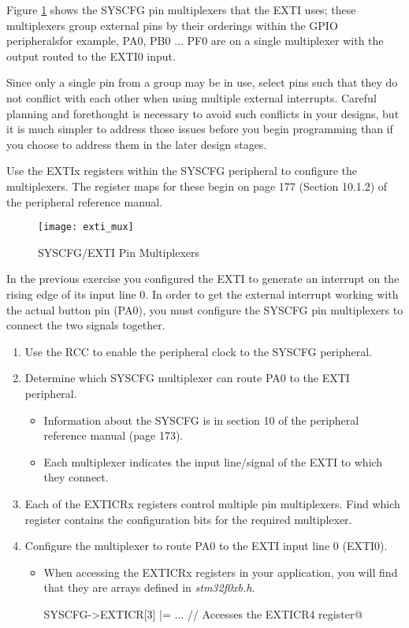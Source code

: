 \documentclass[openany,11pt,fleqn]{book} %
\makeatletter
\newcommand{\ilcode}[1]{
    \smallskip
    \colorbox{gray!20!white}{
        \centering
        \parbox{\linewidth-2\fboxsep}{
            \lstinline@#1@
        }
    }
}
\makeatother
\begin{document}
Figure \ref{exti_mux} shows the SYSCFG pin multiplexers that the EXTI uses; these multiplexers group external pins by their orderings within the GPIO peripherals\textemdash for example, PA0, PB0 ... PF0 are on a single multiplexer with the output routed to the EXTI0 input. 

\begin{warning}Since only a single pin from a group may be in use, select pins such that they do not conflict with each other when using multiple external interrupts. Careful planning and forethought is necessary to avoid such conflicts in your designs, but it is much simpler to address those issues before you begin programming than if you choose to address them in the later design stages.
\end{warning}

Use the EXTIx registers within the SYSCFG peripheral to configure the multiplexers. The register maps for these begin on page 177 (Section 10.1.2) of the peripheral reference manual. 

\begin{figure}[]
    \centering\texttt{[image: exti\_mux]}
    \caption{SYSCFG/EXTI Pin Multiplexers}
    \label{exti_mux}
\end{figure}

\begin{exercise}
    \label{ex3}
    In the previous exercise you configured the EXTI to generate an interrupt on the rising edge of its input line 0. In order to get the external interrupt working with the actual button pin (PA0), you must configure the SYSCFG pin multiplexers to connect the two signals together. 
    \begin{enumerate}
        \item Use the RCC to enable the peripheral clock to the SYSCFG peripheral.
        \item Determine which SYSCFG multiplexer can route PA0 to the EXTI peripheral.
        \begin{itemize}
            \item Information about the SYSCFG is in section 10 of the peripheral reference manual (page 173).
            \item Each multiplexer indicates the input line/signal of the EXTI to which they connect.
        \end{itemize}
        \item Each of the EXTICRx registers control multiple pin multiplexers. Find which register contains the configuration bits for the required multiplexer. 
        \item Configure the multiplexer to route PA0 to the EXTI input line 0 (EXTI0).
        \begin{itemize}
            \item When accessing the EXTICRx registers in your application, you will find that they are arrays defined in \textit{stm32f0xb.h}. \\
            \ilcode{SYSCFG->EXTICR[3] |= ...   // Accesses the EXTICR4 register}
        \end{itemize} 
    \end{enumerate}
\end{exercise}
\end{document}
